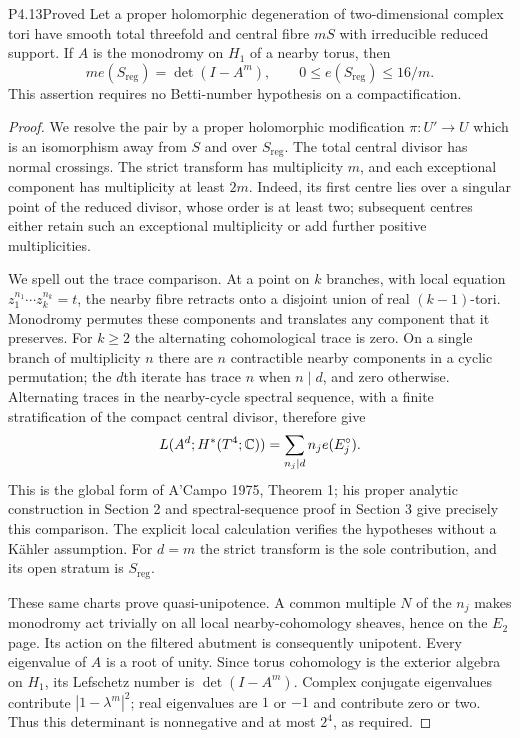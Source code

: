 \begin{statement}{P4.13}{Proved}
Let a proper holomorphic degeneration of two-dimensional complex
tori have smooth total threefold and central fibre $mS$ with
irreducible reduced support. If $A$ is the monodromy on $H_1$ of
a nearby torus, then
\[
 m e(S_{\mathrm{reg}})=\det(I-A^m),\qquad
 0\le e(S_{\mathrm{reg}})\le16/m.
\]
This assertion requires no Betti-number hypothesis on a compactification.
\end{statement}
\begin{proof}
We resolve the pair by a proper holomorphic modification
$\pi:U'\to U$ which is an isomorphism away from $S$ and over
$S_{\mathrm{reg}}$. The total central divisor has normal crossings.
The strict transform has multiplicity $m$, and each exceptional
component has multiplicity at least $2m$. Indeed, its first centre
lies over a singular point of the reduced divisor, whose order is
at least two; subsequent centres either retain such an exceptional
multiplicity or add further positive multiplicities.

We spell out the trace comparison. At a point on $k$ branches,
with local equation $z_1^{n_1}\cdots z_k^{n_k}=t$, the nearby
fibre retracts onto a disjoint union of real $(k-1)$-tori.
Monodromy permutes these components and translates any component
that it preserves. For $k\ge2$ the alternating cohomological
trace is zero. On a single branch of multiplicity $n$ there are
$n$ contractible nearby components in a cyclic permutation;
the $d$th iterate has trace $n$ when $n\mid d$, and zero otherwise.
Alternating traces in the nearby-cycle spectral sequence, with a
finite stratification of the compact central divisor, therefore give
\[
 L(A^d;H^*(T^4;\mathbb C))=\sum_{n_j\mid d}n_j e(E_j^\circ).
\]
This is the global form of A'Campo 1975, Theorem 1; his proper
analytic construction in Section 2 and spectral-sequence proof in
Section 3 give precisely this comparison. The explicit local
calculation verifies the hypotheses without a Kähler assumption.
For $d=m$ the strict transform is the sole contribution, and its
open stratum is $S_{\mathrm{reg}}$.

These same charts prove quasi-unipotence. A common multiple $N$
of the $n_j$ makes monodromy act trivially on all local
nearby-cohomology sheaves, hence on the $E_2$ page. Its action
on the filtered abutment is consequently unipotent. Every
eigenvalue of $A$ is a root of unity. Since torus cohomology is
the exterior algebra on $H_1$, its Lefschetz number is
$\det(I-A^m)$. Complex conjugate eigenvalues contribute
$|1-\lambda^m|^2$; real eigenvalues are $1$ or $-1$ and
contribute zero or two. Thus this determinant is nonnegative
and at most $2^4$, as required.
\end{proof}

